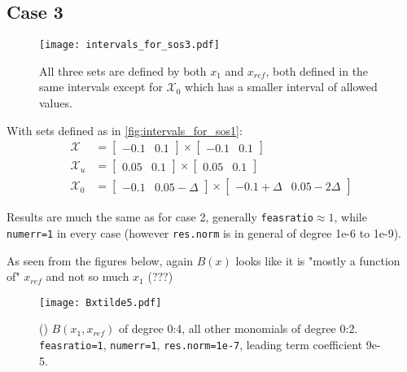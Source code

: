 
\subsection{Case 3}\label{case3}
\begin{figure}[htbp]
\centering\texttt{[image: intervals\_for\_sos3.pdf]}
\caption{All three sets are defined by both $x_1$ and $x_{ref}$, both defined in the same intervals except for $\mathcal{X}_0$ which has a smaller interval of allowed values.}
\label{fig:intervals_for_sos3}
\end{figure}

With sets defined as in \autoref{fig:intervals_for_sos1}:
\begin{align}
	\mathcal{X} &= \begin{bmatrix} -0.1 & 0.1\end{bmatrix} \times \begin{bmatrix} -0.1 & 0.1\end{bmatrix}\\
	\mathcal{X}_u &= \begin{bmatrix} 0.05 & 0.1\end{bmatrix} \times \begin{bmatrix} 0.05 & 0.1\end{bmatrix}\\
	\mathcal{X}_0 &= \begin{bmatrix} -0.1 & 0.05-\Delta\end{bmatrix} \times \begin{bmatrix} -0.1+\Delta & 0.05-2\Delta\end{bmatrix}
\end{align}

Results are much the same as for case 2, generally \texttt{feasratio}$\approx 1$, while \texttt{numerr=1} in every case (however \texttt{res.norm} is in general of degree 1e-6 to 1e-9).

As seen from the figures below, again $B(x)$ looks like it is "mostly a function of" $x_{ref}$ and not so much $x_1$ (???)

\begin{figure}[h]
\centering\texttt{[image: Bxtilde5.pdf]}
\caption{() $B(x_1,x_{ref})$ of degree 0:4, all other monomials of degree 0:2. \texttt{feasratio=1}, \texttt{numerr=1}, \texttt{res.norm=1e-7}, leading term coefficient 9e-5.}
\label{fig:Bxtilde5}
\end{figure}

